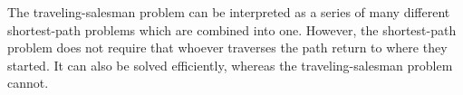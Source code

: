 
The traveling-salesman problem can be interpreted as a series of many different
shortest-path problems which are combined into one. However, the shortest-path
problem does not require that whoever traverses the path return to where they
started. It can also be solved efficiently, whereas the traveling-salesman
problem cannot.
